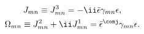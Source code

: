\begin{equation}
\begin{gathered}
   J_{mn} \equiv J^3_{mn} = - \ii\bar{\epsilon}\gamma_{mn}\epsilon , \\
   \Omega_{mn} \equiv J^2_{mn} + \ii J^1_{mn} 
      = \bar{\epsilon}^\conj\gamma_{mn}\epsilon .
\end{gathered}
\end{equation}

